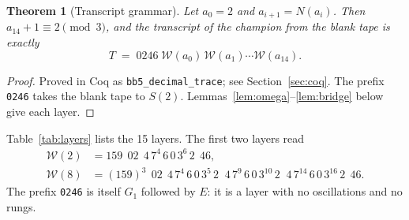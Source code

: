 \documentclass[11pt]{article}
\newtheorem{theorem}{Theorem}
\theoremstyle{definition}
\theoremstyle{remark}
\newcommand{\coq}[1]{\texttt{#1}}
\newcommand{\W}{\mathcal{W}}
\begin{document}
\begin{theorem}[Transcript grammar]\label{thm:main}
Let $a_0 = 2$ and $a_{i+1} = N(a_i)$. Then $a_{14}+1 \equiv 2 \pmod 3$, and the
transcript of the champion from the blank tape is exactly
\[
T \;=\; 0246\;\W(a_0)\,\W(a_1)\cdots\W(a_{14}).
\]
\end{theorem}

\begin{proof}
Proved in Coq as \coq{bb5\_decimal\_trace}; see Section~\ref{sec:coq}. The prefix
\texttt{0246} takes the blank tape to $S(2)$. Lemmas~\ref{lem:omega}--\ref{lem:bridge}
below give each layer.
\end{proof}

Table~\ref{tab:layers} lists the 15 layers. The first two layers read
\begin{align*}
\W(2) &= 159\;\,02\;\,4\,7^{4}\,6\,0\,3^{6}\,2\;\,46,\\
\W(8) &= (159)^3\;\,02\;\,4\,7^{4}\,6\,0\,3^{5}\,2\;\;4\,7^{9}\,6\,0\,3^{10}\,2\;\;
          4\,7^{14}\,6\,0\,3^{16}\,2\;\,46 .
\end{align*}
The prefix \texttt{0246} is itself $G_1$ followed by $E$: it is a layer with no
oscillations and no rungs.
\end{document}
